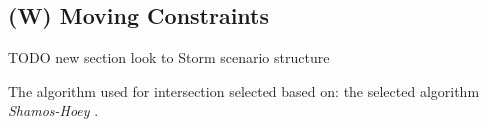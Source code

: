 \subsection{(W) Moving Constraints}\label{s:MovingVirtualConstraints}
TODO new section look to Storm scenario structure

The algorithm used for intersection selected based on:\citep{bentley1979algorithms} the selected algorithm  \emph{Shamos-Hoey} \cite{shamos1976geometric}.
